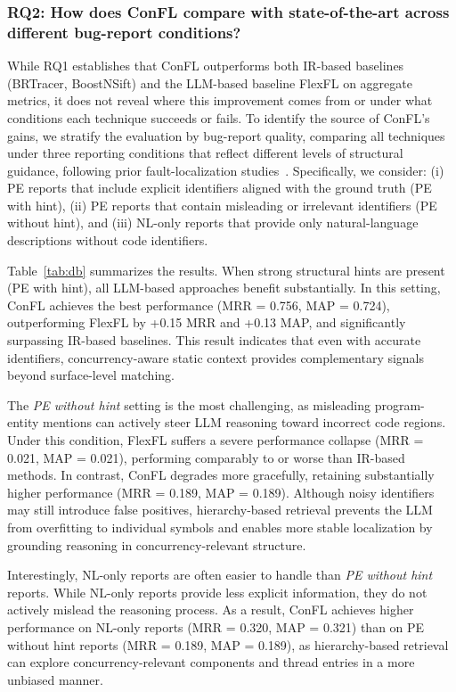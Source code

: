 \subsubsection{RQ2: How does ConFL compare with state-of-the-art across different bug-report conditions?}

While RQ1 establishes that ConFL outperforms both IR-based baselines (BRTracer, BoostNSift) and the LLM-based baseline FlexFL on aggregate metrics, it does not reveal where this improvement comes from or under what conditions each technique succeeds or fails. To identify the source of ConFL's gains, we stratify the evaluation by bug-report quality, comparing all techniques under three reporting conditions that reflect different levels of structural guidance, following prior fault-localization studies~\cite{shao2024enhancing, blizzard, shao2023information}.
Specifically, we consider: (i) PE reports that include explicit identifiers aligned with the ground truth (PE with hint),
(ii) PE reports that contain misleading or irrelevant identifiers (PE without hint), and
(iii) NL-only reports that provide only natural-language descriptions without code identifiers.


Table~\ref{tab:db} summarizes the results.
When strong structural hints are present (PE with hint), all LLM-based approaches benefit substantially.
In this setting, ConFL achieves the best performance (MRR = 0.756, MAP = 0.724), outperforming FlexFL by +0.15 MRR and +0.13 MAP, and significantly surpassing IR-based baselines.
This result indicates that even with accurate identifiers, concurrency-aware static context provides complementary signals beyond surface-level matching.

The \emph{PE without hint} setting is the most challenging, as misleading program-entity mentions can actively steer LLM reasoning toward incorrect code regions.
Under this condition, FlexFL suffers a severe performance collapse (MRR = 0.021, MAP = 0.021), performing comparably to or worse than IR-based methods.
In contrast, ConFL degrades more gracefully, retaining substantially higher performance (MRR = 0.189, MAP = 0.189).
Although noisy identifiers may still introduce false positives, hierarchy-based retrieval prevents the LLM from overfitting to individual symbols and enables more stable localization by grounding reasoning in concurrency-relevant structure.

Interestingly, NL-only reports are often easier to handle than \emph{PE without hint} reports.
While NL-only reports provide less explicit information, they do not actively mislead the reasoning process.
As a result, ConFL achieves higher performance on NL-only reports (MRR = 0.320, MAP = 0.321) than on PE without hint reports (MRR = 0.189, MAP = 0.189), as hierarchy-based retrieval can explore concurrency-relevant components and thread entries in a more unbiased manner.

